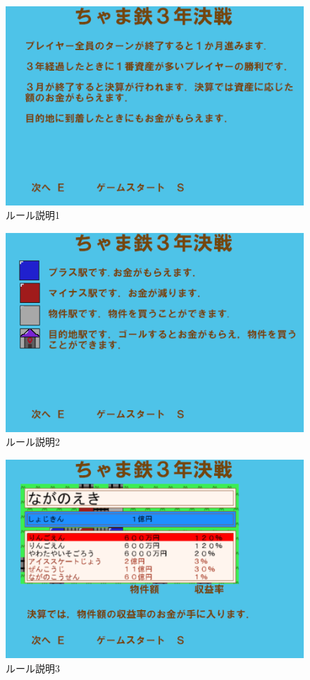 \documentclass[a4j]{jarticle}
\begin{document}
    \begin{figure}[H]
        \centering
        \includegraphics[scale=2.0]{sp5.png}
        \caption{ルール説明1}
         \label{rule1}
        \end{figure}
    \begin{figure}[H]
        \centering
        \includegraphics[scale=2.0]{sp6.png}
        \caption{ルール説明2}
         \label{rule2}
        \end{figure}
    \begin{figure}[H]
        \centering
        \includegraphics[scale=2.0]{sp7.png}
        \caption{ルール説明3}
         \label{rule3}
        \end{figure}
\end{document}
